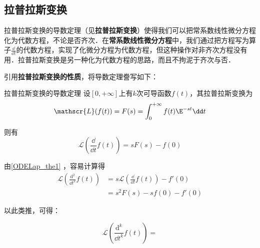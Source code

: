 

\subsection{拉普拉斯变换}

拉普拉斯变换的导数定理（见\textbf{拉普拉斯变换}）使得我们可以把常系数线性微分方程化为代数方程，不论是否齐次．在\textbf{常系数线性微分方程}中，我们通过把方程写为算子$\frac{\dd }{\dd t}$的代数方程，实现了化微分方程为代数方程，但这种操作对非齐次方程没有用．拉普拉斯变换是另一种化为代数方程的思路，而且不拘泥于齐次与否．

引用\textbf{拉普拉斯变换的性质}，将导数定理誊写如下：
\begin{theorem}{拉普拉斯变换的导数定理}\label{ODELap_the1}
设$[0, +\infty]$上有$k$次可导函数$f(t)$，其拉普拉斯变换为
\begin{equation}
\mathscr{L}(f(t))=F(s)=\int^{+\infty}_0f(t)\E^{-st}\dd t
\end{equation}

则有
\begin{equation}
\mathscr{L}(\frac{\dd}{\dd t}f(t))=sF(s)-f(0)
\end{equation}
\end{theorem}

由\autoref{ODELap_the1} ，容易计算得
\begin{equation}
\begin{aligned}
\mathscr{L}(\frac{\mathrm{d}^2}{\dd t^2}f(t))&=s\mathscr{L}(\frac{\dd}{\dd t}f(t))-f'(0)\\
&=s^2F(s)-sf(0)-f'(0)
\end{aligned}
\end{equation}

以此类推，可得：

\begin{corollary}{}
\begin{equation}
\mathscr{L}(\frac{\mathrm{d}^k}{\dd t^k}f(t))=
\end{equation}




\end{corollary}





















